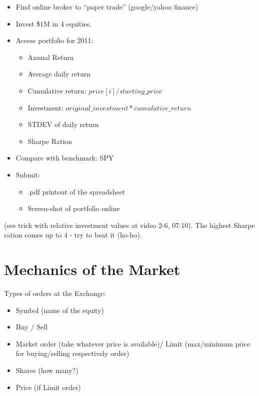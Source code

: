 \documentclass{scrartcl}
\begin{document}
\begin{itemize}
\item Find online broker to ``paper trade'' (google/yahoo finance)
\item Invest \$1M in 4 equities.
\item Access portfolio for 2011:
  \begin{itemize}
  \item Annual Return
  \item Average daily return
  \item Cumulative return: $price[i]/starting\_price$
  \item Investment: $original\_investment * cumulative\_return$
  \item STDEV of daily return
  \item Sharpe Ration
  \end{itemize}
\item Compare with benchmark: SPY
\item Submit:
  \begin{itemize}
  \item .pdf printout of the spreadsheet
  \item Screen-shot of portfolio online
  \end{itemize}
\end{itemize}
(see trick with relative investment values at video 2-6, 07:10). The highest
Sharpe ration comes up to 4 - try to beat it (ho-ho).

\section{Mechanics of the Market}
\label{sec:MechanicsOfMarkets}
Types of orders at the Exchange:
\begin{itemize}
\item Symbol (name of the equity)
\item Buy / Sell
\item Market order (take whatever price is available)/ Limit (max/minimum price
  for buying/selling respectively order)
\item Shares (how many?)
\item Price (if Limit order)
\end{itemize}
\end{document}
